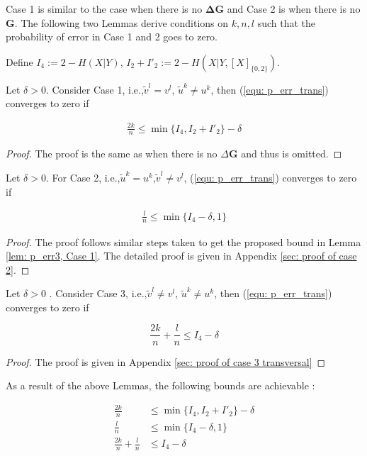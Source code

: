 Case 1 is similar to the case when there is no $\mathbf{\Delta G}$ and Case 2 is when there is no $\mathbf{G}$. The following two Lemmas derive conditions on $k,n,l$ such that the probability of error in Case 1 and 2 goes to zero.

Define $I_4:=2-H(X|Y)$, $I_2+I'_2:=2-H(X|Y,[X]_{\{ 0,2\}})$.
\begin{lem}\label{lem: p_err case1_transversal}
Let $\delta >0$. Consider Case 1, i.e.,$\tilde{v}^l=v^l$, $\tilde{u}^k\neq u^k$, then (\ref{equ: p_err_trans}) converges to zero if

\begin{align*}
\frac{2k}{n} \leq \min \{I_4, I_2+I'_2\}-\delta
\end{align*}
 
\end{lem}
\begin{proof}
The proof is the same as when there is no $\Delta\mathbf{G}$ and thus is omitted.
\end{proof}
\begin{lem} \label{lem: p_err case2_transversal}
Let $\delta >0$. For Case 2, i.e.,$\tilde{u}^k=u^k$,$\tilde{v}^l \neq v^l$, (\ref{equ: p_err_trans}) converges to zero if

\begin{align*}
\frac{l}{n} \leq \min\{I_4-\delta, 1\}
\end{align*}

\end{lem}



\begin{proof}

The proof follows similar steps taken to get the  proposed bound in Lemma \ref{lem: p_err3, Case 1}. The detailed proof is given in Appendix \ref{sec: proof of case 2}. 
 
\end{proof}




\begin{lem}\label{lem: p_err case3_transversal}
Let $\delta >0$ . Consider Case 3, i.e.,$\tilde{v}^l\neq v^l$, $\tilde{u}^k\neq u^k$, then (\ref{equ: p_err_trans}) converges to zero if

\begin{equation*}
\frac{2k}{n}+\frac{l}{n}\leq I_4-\delta
\end{equation*}

\end{lem}


\begin{proof}
The proof is given in Appendix \ref{sec: proof of case 3 transversal} 
\end{proof}

As a result of the above Lemmas, the following bounds are achievable :


\begin{align}
\frac{2k}{n} &\leq \min \{I_4, I_2+I'_2\}-\delta\\
\frac{l}{n} &\leq \min\{I_4-\delta, 1\}\\
\frac{2k}{n}+\frac{l}{n}&\leq I_4-\delta
\end{align}